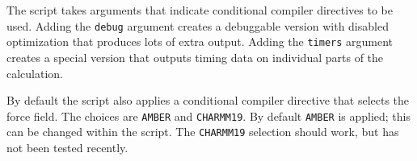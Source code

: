 \documentclass{article}      %
\begin{document}
The script takes arguments that indicate conditional compiler directives to be used.  Adding the \verb+debug+ argument creates a debuggable version with disabled optimization that produces lots of extra output.  Adding the \verb+timers+ argument creates a special version that outputs timing data on individual parts of the calculation.

By default the script also applies a conditional compiler directive that selects the force field.  The choices are \verb+AMBER+ and \verb+CHARMM19+.   By default \verb+AMBER+ is applied; this can be changed within the script.    The \verb+CHARMM19+ selection should work, but has not been tested recently.   
\end{document}
